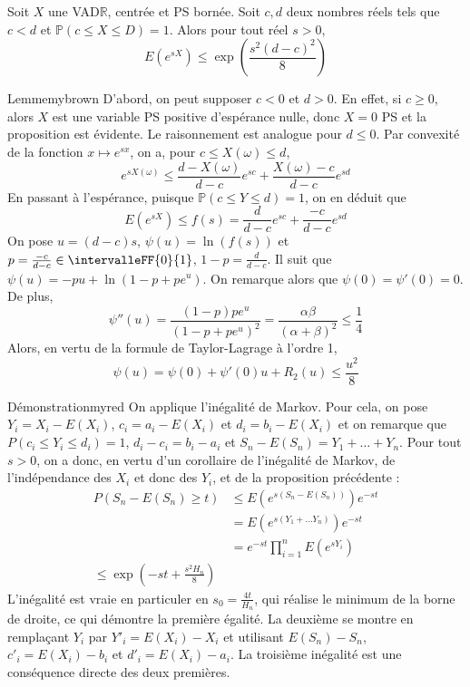     \begin{lem}{}{}
        Soit $X$ une VAD$\mathbb{R}$, centrée et PS bornée. Soit $c,d$ deux nombres réels tels que $c < d$ et $\mathbb{P}(c \leq X \leq D) = 1$. Alors pour tout réel $s > 0$, 
        \[ E(e^{sX}) \leq \exp\left(\frac{s^2 (d - c)^2}{8}\right) \]   
    \end{lem}

    \begin{demo}{Lemme}{mybrown}
        D’abord, on peut supposer $c < 0$ et $d > 0$. En effet, si $c \geq 0$, alors $X$ est une variable PS positive d’espérance nulle, donc $X = 0$ PS et la proposition est évidente. Le raisonnement est analogue pour $d \leq 0$. Par convexité de la fonction $x \mapsto e^{sx}$, on a, pour $c \leq X(\omega) \leq d$, 
        \[ e^{s X(\omega)} \leq \frac{d - X(\omega)}{d-c}e^{sc} + \frac{X(\omega) - c}{d-c} e^{sd} \]    
        En passant à l’espérance, puisque $\mathbb{P}(c \leq Y \leq d) = 1$, on en déduit que 
        \[ E(e^{sX}) \leq f(s) = \frac{d}{d-c}e^{sc} + \frac{-c}{d - c} e^{sd} \]   
        On pose $u = (d-c)s$, $\psi(u) = \ln(f(s))$ et $p = \frac{-c}{d-c} \in \intervalleFF{0}{1}$, $1 - p = \frac{d}{d-c}$. Il suit que $\psi(u) = -pu + \ln(1 - p + pe^u)$. On remarque alors que $\psi(0) = \psi'(0) = 0$. De plus, 
        \[ \psi''(u) = \frac{(1-p)pe^u}{(1 - p + pe^u)^2} = \frac{\alpha \beta}{(\alpha + \beta)^2} \leq \frac{1}{4} \]   
        Alors, en vertu de la formule de Taylor-Lagrage à l’ordre 1, 
        \[ \psi(u) = \psi(0) + \psi'(0)u + R_2(u) \leq \frac{u^2}{8} \]   
    \end{demo}

    \begin{demo}{Démonstration}{myred}
        On applique l’inégalité de Markov. Pour cela, on pose $Y_i = X_i - E(X_i)$, $c_i = a_i - E(X_i)$ et $d_i = b_i - E(X_i)$ et on remarque que $P(c_i \leq Y_i \leq d_i) = 1$, $d_i - c_i = b_i - a_i$ et $S_n - E(S_n) = Y_1 + \ldots + Y_n$. Pour tout $s > 0$, on a donc, en vertu d’un corollaire de l’inégalité de Markov, de l’indépendance des $X_i$ et donc des $Y_i$, et de la proposition précédente :
        \begin{align*}
            P(S_n - E(S_n) \geq t) 
            &\leq E(e^{s(S_n - E(S_n))}) e^{-st} \\
            &= E(e^{s(Y_1 + \ldots Y_n)}) e^{-st} \\
            &= e^{-st} \prod_{i=1}^n E(e^{sY_i}) \\
            \leq \exp\left(-st + \frac{s^2 H_n}{8}\right)
        \end{align*}
        L’inégalité est vraie en particuler en $s_0 = \frac{4t}{H_n}$, qui réalise le minimum de la borne de droite, ce qui démontre la première égalité. La deuxième se montre en remplaçant $Y_i$ par $Y'_i = E(X_i) - X_i$ et utilisant $E(S_n) - S_n$, $c'_i = E(X_i) - b_i$ et $d'_i = E(X_i) - a_i$. La troisième inégalité est une conséquence directe des deux premières.
    \end{demo}

